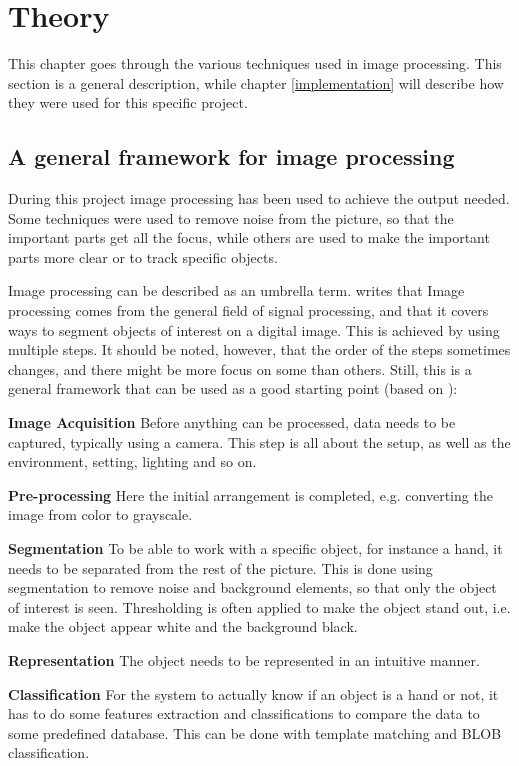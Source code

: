 \chapter{Theory}\label{theory_part}
This chapter goes through the various techniques used in image processing. This section is a general description, while chapter \ref{implementation} will describe how they were used for this specific project.

\section{A general framework for image processing}
During this project image processing has been used to achieve the output needed. Some techniques were used to remove noise from the picture, so that the important parts get all the focus, while others are used to make the important parts more clear or to track specific objects.

Image processing can be described as an umbrella term. \citep{ip_book} writes that Image processing comes from the general field of signal processing, and that it covers ways to segment objects of interest on a digital image. This is achieved by using multiple steps. It should be noted, however, that the order of the steps sometimes changes, and there might be more focus on some than others. Still, this is a general framework that can be used as a good starting point (based on \citep{ip_book}):

\textbf{Image Acquisition}
Before anything can be processed, data needs to be captured, typically using a camera. This step is all about the setup, as well as the environment, setting, lighting and so on.

\textbf{Pre-processing}
Here the initial arrangement is completed, e.g. converting the image from color to grayscale.

\textbf{Segmentation}
To be able to work with a specific object, for instance a hand, it needs to be separated from the rest of the picture. This is done using segmentation to remove noise and background elements, so that only the object of interest is seen. Thresholding is often applied to make the object stand out, i.e. make the object appear white and the background black.

\textbf{Representation}
The object needs to be represented in an intuitive manner.

\textbf{Classification}
For the system to actually know if an object is a hand or not, it has to do some features extraction and classifications to compare the data to some predefined database. This can be done with template matching and BLOB classification.

